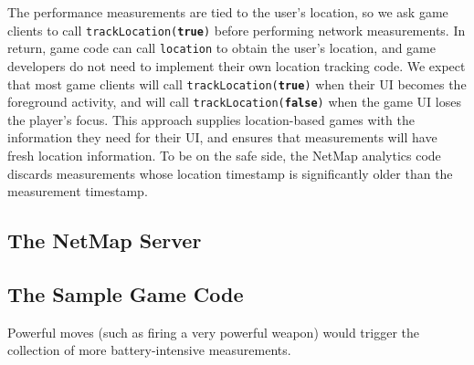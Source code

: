 The performance measurements are tied to the user's location, so we ask game
clients to call \texttt{trackLocation(\textbf{true})} before performing network
measurements. In return, game code can call \texttt{location} to obtain the
user's location, and game developers do not need to implement their own
location tracking code. We expect that most game clients will call
\texttt{trackLocation(\textbf{true})} when their UI becomes the foreground
activity, and will call \texttt{trackLocation(\textbf{false})} when the game UI
loses the player's focus. This approach supplies location-based games with the
information they need for their UI, and ensures that measurements will have
fresh location information. To be on the safe side, the NetMap analytics code
discards measurements whose location timestamp is significantly older than the
measurement timestamp.



\subsection{The NetMap Server}


\subsection{The Sample Game Code}

Powerful moves (such as firing a very powerful
weapon) would trigger the collection of more battery-intensive measurements.

